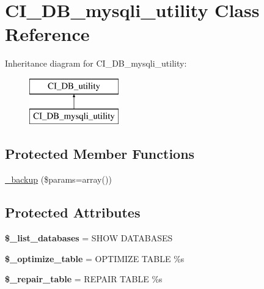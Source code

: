 \hypertarget{class_c_i___d_b__mysqli__utility}{}\section{C\+I\+\_\+\+D\+B\+\_\+mysqli\+\_\+utility Class Reference}
\label{class_c_i___d_b__mysqli__utility}
Inheritance diagram for C\+I\+\_\+\+D\+B\+\_\+mysqli\+\_\+utility\+:\begin{figure}[H]
\begin{center}
\leavevmode
\includegraphics[height=2.000000cm]{class_c_i___d_b__mysqli__utility}
\end{center}
\end{figure}
\subsection*{Protected Member Functions}
\begin{DoxyCompactItemize}
\item 
\mbox{\hyperlink{class_c_i___d_b__mysqli__utility_a777a35b2ed62ac0c697f2bb66b697ca3}{\+\_\+backup}} (\$params=array())
\end{DoxyCompactItemize}
\subsection*{Protected Attributes}
\begin{DoxyCompactItemize}
\item 
\mbox{\label{class_c_i___d_b__mysqli__utility_ad324cba8afe6e27422d7f076f63c2b5e}} 
{\bfseries \$\+\_\+list\+\_\+databases} = \textquotesingle{}S\+H\+OW D\+A\+T\+A\+B\+A\+S\+ES\textquotesingle{}
\item 
\mbox{\label{class_c_i___d_b__mysqli__utility_a3636cd48a30dfdb04212fe9e5adc3bb4}} 
{\bfseries \$\+\_\+optimize\+\_\+table} = \textquotesingle{}O\+P\+T\+I\+M\+I\+ZE T\+A\+B\+LE \%s\textquotesingle{}
\item 
\mbox{\label{class_c_i___d_b__mysqli__utility_a032586db7de5b841467be3af8a014b52}} 
{\bfseries \$\+\_\+repair\+\_\+table} = \textquotesingle{}R\+E\+P\+A\+IR T\+A\+B\+LE \%s\textquotesingle{}
\end{DoxyCompactItemize}

